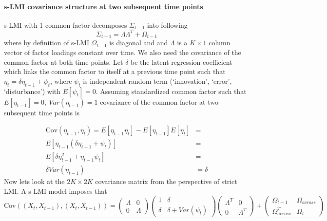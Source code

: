 \documentclass[
  letterpaper,
  DIV=11,
  numbers=noendperiod]{scrartcl}
\let\oldparagraph\paragraph
\renewcommand{\paragraph}[1]{\oldparagraph{#1}\mbox{}}
\begin{document}
\hypertarget{s-lmi-covariance-structure-at-two-subsequent-time-points}{%
\paragraph{s-LMI covariance structure at two subsequent time
points}\label{s-lmi-covariance-structure-at-two-subsequent-time-points}}

s-LMI with 1 common factor decomposes \(\Sigma_{t-1}\) into following
\[\Sigma_{t-1}=\Lambda\Lambda^T+\Omega_{t-1}\]where by definition of
s-LMI \(\Omega_{t-1}\) is diagonal and and \(\Lambda\) is a \(K\times1\)
column vector of factor loadings constant over time. We also need the
covariance of the common factor at both time points. Let \(\delta\) be
the latent regression coefficient which links the common factor to
itself at a previous time point such that
\(\eta_t=\delta\eta_{t-1}+\psi_t\), where \(\psi_t\) is independent
random term (`innovation', `error', `disturbance') with \(E[\psi_t]=0\).
Assuming standardized common factor such that
\(E[\eta_{t-1}]=0,\:Var(\eta_{t-1})=1\) covariance of the common factor
at two subsequent time points is

\[
\begin{align*} \text{Cov}(\eta_{t-1},\eta_t)= E[\eta_{t-1}\eta_t]-E[\eta_{t-1}]E[\eta_t]&=\\ E[\eta_{t-1}(\delta\eta_{t-1}+\psi_t)]&=\\ E[\delta\eta_{t-1}^2+\eta_{t-1}\psi_t]&=\\ \delta Var(\eta_{t-1})&= \delta \end{align*}
\] Now lets look at the \(2K\times 2K\) covariance matrix from the
perspective of strict LMI. A s-LMI model imposes that \[
\text{Cov}((X_{t},X_{t-1}),(X_{t},X_{t-1}))= \begin{pmatrix}    \Lambda & 0
\\   0 & \Lambda \end{pmatrix}  \begin{pmatrix}   1 & \delta 
\\   \delta & \delta+Var(\psi_t) \end{pmatrix} \begin{pmatrix}    \Lambda^T & 0
\\   0 & \Lambda^T \end{pmatrix} + \begin{pmatrix}   \Omega_{t-1} & \Omega_{across} 
\\   \Omega_{across}^T & \Omega_t \end{pmatrix} 
\]
\end{document}
